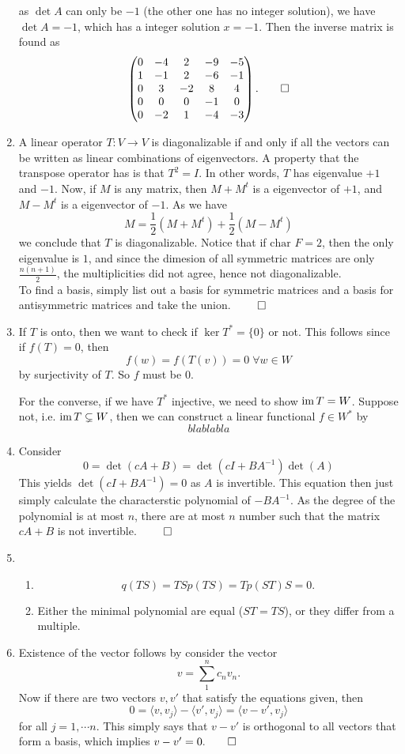 \begin{enumerate}
    as $\det A$ can only be $-1$ (the other one has no integer solution), we have $\det A = -1$, which has a integer solution $x= - 1$. Then the inverse matrix is found as 
    \[
    \begin{pmatrix}
    0&-4&2&-9&-5\\1&-1&2&-6&-1\\0&3&-2&8&4\\0&0&0&-1&0\\0&-2&1&-4&-3
    \end{pmatrix}. \qed
    \]
    \item A linear operator $T:V \to V$ is diagonalizable if and only if all the vectors can be written as linear combinations of eigenvectors.
    A property that the transpose operator has is that $T^2 = I$. In other words, $T$ has eigenvalue $+1$ and $-1$.
    Now, if $M$ is any matrix, then $M + M^t$ is a eigenvector of $+1$, and $M - M^t$ is a eigenvector of $-1$. As we have
    \[
    M = \frac{1}{2}(M + M^t) + \frac{1}{2}(M - M^t)	
    \]
    we conclude that $T$ is diagonalizable. Notice that if $\text{char } F = 2$, then the only eigenvalue is $1$, and since the dimesion of all symmetric matrices are only $\frac{n(n+1)}{2}$, the multiplicities did not agree, hence not diagonalizable. \\
    To find a basis, simply list out a basis for symmetric matrices and a basis for antisymmetric matrices and take the union. $\qed$
    \item If $T$ is onto, then we want to check if $\ker T^* = \{0\}$ or not. This follows since if $f(T) = 0$, then
    \[
    f(w) = f(T(v)) = 0 \; \forall w \in W 
    \]
    by surjectivity of $T$. So $f$ must be $0$. 

    For the converse, if we have $T^*$ injective, we need to show $\operatorname{im} T = W$. Suppose not, i.e. $\operatorname{im} T \subsetneq W$, then we can construct a linear functional $f \in W^*$ by
    \[
    blablabla
    \]
    \item Consider 
    \[0 = \det (cA+B) = \det (cI + BA^{-1}) \det(A)\]
    This yields $\det (cI + BA^{-1}) = 0$ as $A$ is invertible. This equation then just simply calculate the characterstic polynomial of $-BA^{-1}$. As the degree of the polynomial is at most $n$, there are at most $n$ number such that the matrix $cA+B$ is not invertible. $\qed$
    \item
    \begin{enumerate}
        \item 
        \[
        q(TS) = TSp(TS) = Tp(ST)S = 0.	
        \]
        \item Either the minimal polynomial are equal ($ST = TS$), or they differ from a multiple.
    \end{enumerate}
    \item Existence of the vector follows by consider the vector
    \[
    v = \sum_1^n c_n v_n.	
    \]
    Now if there are two vectors $v, v'$ that satisfy the equations given, then
    \[
    0 = \langle v, v_j \rangle - \langle v', v_j \rangle = \langle v-v', v_j \rangle 	
    \]
    for all $j = 1, \cdots n$. This simply says that $v - v'$ is orthogonal to all vectors that form a basis, which implies $v - v' = 0. \qed$
\end{enumerate}